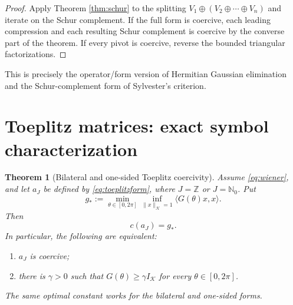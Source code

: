\documentclass[11pt]{article}
\newtheorem{theorem}{Theorem}
\theoremstyle{definition}
\newcommand{\N}{\mathbb N_0}
\newcommand{\K}{\mathcal K}
\begin{document}
\begin{proof}
Apply Theorem \ref{thm:schur} to the splitting
$V_1\oplus(V_2\oplus\cdots\oplus V_n)$ and iterate on the Schur complement.
If the full form is coercive, each leading compression and each resulting
Schur complement is coercive by the converse part of the theorem.  If every
pivot is coercive, reverse the bounded triangular factorizations.
\end{proof}

This is precisely the operator/form version of Hermitian Gaussian elimination
and the Schur-complement form of Sylvester's criterion.

\section{Toeplitz matrices: exact symbol characterization}

\begin{theorem}[Bilateral and one-sided Toeplitz coercivity]\label{thm:toeplitz}
Assume \eqref{eq:wiener}, and let $a_J$ be defined by
\eqref{eq:toeplitzform}, where $J=\mathbb Z$ or $J=\N$.  Put
\[
 g_*:=\min_{\theta\in[0,2\pi]}
       \inf_{\|x\|_{\K}=1}\langle G(\theta)x,x\rangle.
\]
Then
\begin{equation}\label{eq:optimal}
 c(a_J)=g_*.
\end{equation}
In particular, the following are equivalent:
\begin{enumerate}[label=\textup{(\roman*)}]
\item $a_J$ is coercive;
\item there is $\gamma>0$ such that $G(\theta)\ge\gamma I_{\K}$ for every
      $\theta\in[0,2\pi]$.
\end{enumerate}
The same optimal constant works for the bilateral and one-sided forms.
\end{theorem}
\end{document}
